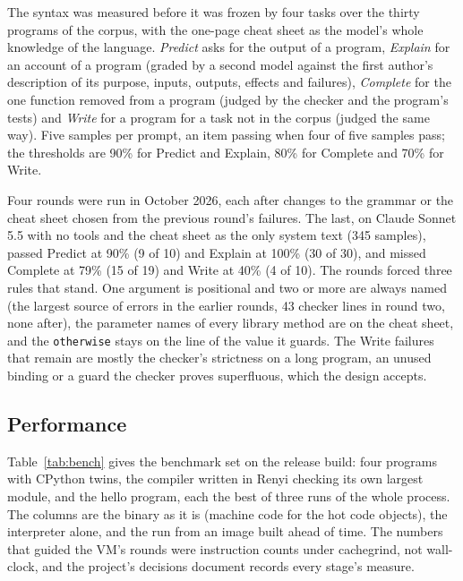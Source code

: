 \documentclass[11pt]{article}
\begin{document}
The syntax was measured before it was frozen by four tasks over the
thirty programs of the corpus, with the one-page cheat sheet as the
model's whole knowledge of the language. \emph{Predict} asks for the
output of a program, \emph{Explain} for an account of a program (graded
by a second model against the first author's description of its
purpose, inputs, outputs, effects and failures), \emph{Complete} for
the one function removed from a program (judged by the checker and the
program's tests) and \emph{Write} for a program for a task not in the
corpus (judged the same way). Five samples per
prompt, an item passing when four of five samples pass; the thresholds
are 90\% for Predict and Explain, 80\% for Complete and 70\% for Write.

Four rounds were run in October 2026, each after changes to the grammar
or the cheat sheet chosen from the previous round's failures. The last,
on Claude Sonnet 5.5 with no tools and the cheat sheet as the only
system text (345 samples), passed Predict at 90\% (9 of 10) and Explain
at 100\% (30 of 30), and missed Complete at 79\% (15 of 19) and Write
at 40\% (4 of 10). The rounds forced three rules that stand. One
argument is positional and two or more are always named (the largest
source of errors in the earlier rounds, 43 checker lines in round two,
none after), the parameter names of every library method are on the
cheat sheet, and the \texttt{otherwise} stays on the line of the value
it guards. The Write failures that remain are mostly the checker's
strictness on a long program, an unused binding or a guard the checker
proves superfluous, which the design accepts.

\subsection{Performance}

Table~\ref{tab:bench} gives the benchmark set on the release build:
four programs with CPython twins, the compiler written in Renyi
checking its own largest module, and the hello program, each the best
of three runs of the whole process. The columns are the binary as it is
(machine code for the hot code objects), the interpreter alone, and the
run from an image built ahead of time. The numbers that guided the VM's
rounds were instruction counts under cachegrind, not wall-clock, and
the project's decisions document records every stage's measure.
\end{document}
